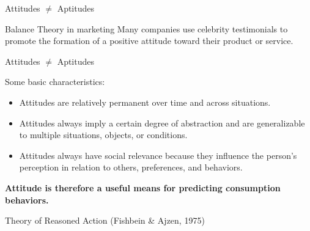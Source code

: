 \documentclass{beamer}
\begin{document}
\begin{frame}{Attitudes $\neq$ Aptitudes}
    \begin{block}{Balance Theory in marketing}
        Many companies use celebrity testimonials to promote the formation of a positive attitude toward their product or service.  \\
        \vspace{0.5em}
        \centering
        \pause
    \end{block}
\end{frame}

\begin{frame}{Attitudes $\neq$ Aptitudes}
    \begin{block}{Some basic characteristics:}
        \small
        \begin{itemize}
            \item Attitudes are relatively permanent over time and across situations.
            \item Attitudes always imply a certain degree of abstraction and are generalizable to multiple situations, objects, or conditions.
            \item Attitudes always have social relevance because they influence the person's perception in relation to others, preferences, and behaviors.
        \end{itemize}
        \textbf{Attitude is therefore a useful means for predicting consumption behaviors.}
    \end{block}
\end{frame}


\begin{frame}{Theory of Reasoned Action (Fishbein \& Ajzen, 1975)}
\end{frame}
\end{document}

